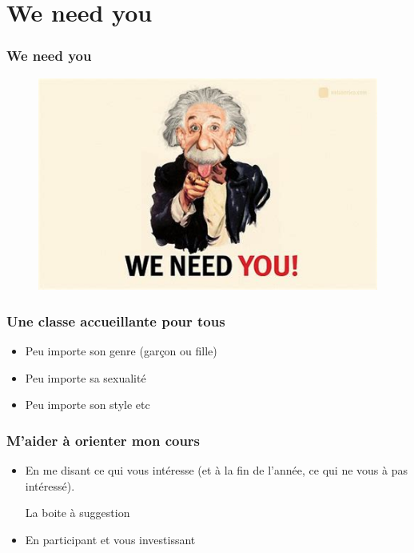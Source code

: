 \documentclass{beamer}
\begin{document}
\section{We need you}
\begin{frame}
\frametitle{We need you}
\begin{figure}
    \includegraphics[width=0.8\linewidth]{we_need_you.jpg}
\end{figure}
\end{frame}

\begin{frame}
    \frametitle{Une classe accueillante pour tous}
    \begin{itemize}
        \item Peu importe son genre (garçon ou fille)
        \item Peu importe sa sexualité
        \item Peu importe son style etc
    \end{itemize}
\end{frame}


\begin{frame}
\frametitle{M'aider à orienter mon cours}

\begin{itemize}
    \item En me disant ce qui vous intéresse 
    (et à la fin de l'année, ce qui ne vous à pas intéressé).

    La boite à suggestion
    \item En participant et vous investissant
\end{itemize}

\end{frame}
\end{document}
